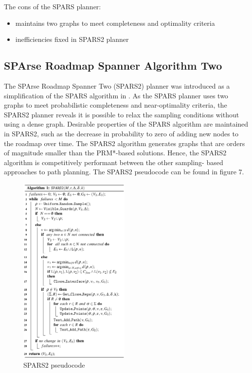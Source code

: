 \documentclass[conference]{IEEEtran} \usepackage[T1]{fontenc} \usepackage[backend=biber, style=ieee]{biblatex}
\begin{document}
The cons of the SPARS planner:
\begin{itemize}
 \item maintains two graphs to meet completeness and optimality criteria
 \item inefficiencies fixed in SPARS2 planner
\end{itemize}

\subsection{SPArse Roadmap Spanner Algorithm Two} \label{SPARS2}
The SPArse Roadmap Spanner Two (SPARS2) planner was introduced as a simplification of the SPARS algorithm in \cite{spars_two}. As the SPARS planner uses two graphs to meet 
probabilistic completeness and near-optimality criteria, the SPARS2 planner reveals it is possible to relax the sampling conditions without using a dense graph. Desirable 
properties of the SPARS algorithm are maintained in SPARS2, such as the decrease in probability to zero of adding new nodes to the roadmap over time. The SPARS2 algorithm
generates graphs that are orders of magnitude smaller than the PRM*-based solutions. Hence, the SPARS2 algorithm is competitively performant between the other sampling-
based approaches to path planning. The SPARS2 pseudocode can be found in figure 7.

\begin{figure}
\label{figure7} 
\centering 
\includegraphics[width=0.49\textwidth]{spars2}
\caption{SPARS2 pseudocode}
\end{figure}
\end{document}
